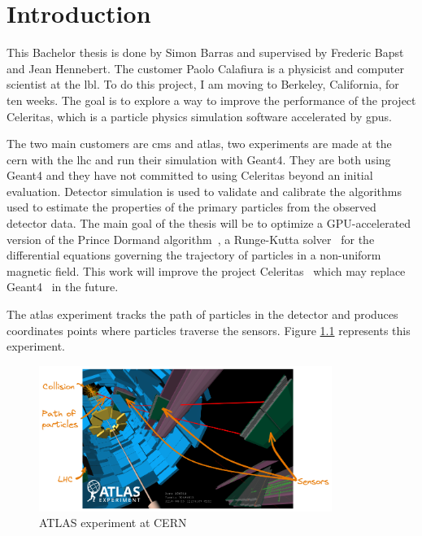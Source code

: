 \chapter{Introduction}
\label{ch:introduction}

This Bachelor thesis is done by Simon Barras and supervised by Frederic Bapst
and Jean Hennebert.
The customer Paolo Calafiura is a physicist and computer scientist at the \acrfull{lbl}.
To do this project, I am moving to Berkeley, California, for ten weeks.
The goal is to explore a way to improve the performance of the project Celeritas,
which is a particle physics simulation software accelerated by \acrshort{gpu}s.

The two main customers are \acrshort{cms} and \acrshort{atlas}, two experiments
are made at the \acrfull{cern} with the \acrfull{lhc} and run
their simulation with Geant4.
They are both using Geant4 and they have not committed to using Celeritas
beyond an initial evaluation.
Detector simulation is used to validate and calibrate the algorithms used to
estimate the properties of the primary particles from the observed detector data.
The main goal of the thesis will be to optimize a GPU-accelerated version of
the Prince Dormand algorithm~\cite{princeDormand}, a
Runge-Kutta solver~\cite{Runge-Kutta-methods} for the differential equations
governing the trajectory of particles in a non-uniform magnetic field.
This work will improve the project Celeritas~\cite{Celeritas-Project} which may
replace Geant4~\cite{geant4} in the future.

The \acrshort{atlas} experiment tracks the path of particles in the detector and
produces coordinates points where particles traverse the sensors.
Figure \ref{fig:introduction:particles:tracking} represents this experiment.
\begin{figure}[ht]
    \centering
    \includegraphics[width=0.85\textwidth]{05-resources/img/spec/experiment-atlas.excalidraw.png}
    \caption{ATLAS experiment at CERN~\cite{atlas-experiment}}
    \label{fig:introduction:particles:tracking}
\end{figure}

